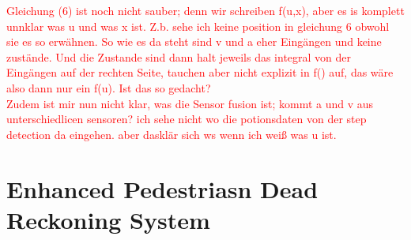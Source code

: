 \documentclass[engproc,conferenceproceedings,submit,pdftex,moreauthors]{Definitions/mdpi}
\begin{document}
\textcolor{red}{Gleichung (6) ist noch nicht sauber; denn wir schreiben f(u,x), aber es is komplett unnklar was u und was x ist. Z.b. sehe ich keine position in gleichung 6 obwohl sie es so erwähnen. So wie es da steht sind v und a eher Eingängen und keine zustände. Und die Zustande sind dann halt jeweils das integral von der Eingängen auf der rechten Seite, tauchen aber nicht explizit in f() auf, das wäre also dann nur ein f(u). Ist das so gedacht? \\ Zudem ist mir nun nicht klar, was die Sensor fusion ist; kommt a und v aus unterschiedlicen sensoren? ich sehe nicht wo die potionsdaten von der step detection da eingehen. aber dasklär sich ws wenn ich weiß was u ist. }




\section{Enhanced Pedestriasn Dead Reckoning System}

	
\end{document}
